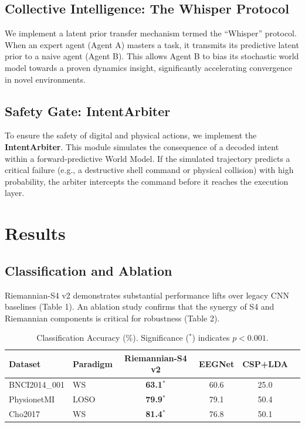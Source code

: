 \documentclass[11pt,a4paper]{article}
\begin{document}
\subsection{Collective Intelligence: The Whisper Protocol}
We implement a latent prior transfer mechanism termed the ``Whisper'' protocol. When an expert agent (Agent A) masters a task, it transmits its predictive latent prior to a naive agent (Agent B). This allows Agent B to bias its stochastic world model towards a proven dynamics insight, significantly accelerating convergence in novel environments.

\subsection{Safety Gate: IntentArbiter}
To ensure the safety of digital and physical actions, we implement the \textbf{IntentArbiter}. This module simulates the consequence of a decoded intent within a forward-predictive World Model. If the simulated trajectory predicts a critical failure (e.g., a destructive shell command or physical collision) with high probability, the arbiter intercepts the command before it reaches the execution layer.

\section{Results}

\subsection{Classification and Ablation}
Riemannian-S4 v2 demonstrates substantial performance lifts over legacy CNN baselines (Table 1). An ablation study confirms that the synergy of S4 and Riemannian components is critical for robustness (Table 2).

\begin{table}[ht]
\centering
\caption{Classification Accuracy (\%). Significance ($^*$) indicates $p < 0.001$.}
\label{tab:results}
\begin{tabular}{@{}llcccc@{}}
\toprule
\textbf{Dataset} & \textbf{Paradigm} & \textbf{Riemannian-S4 v2} & \textbf{EEGNet} & \textbf{CSP+LDA} \\ \midrule
BNCI2014\_001 & WS & \textbf{63.1}$^*$ & 60.6 & 25.0 \\
PhysionetMI & LOSO & \textbf{79.9}$^*$ & 79.1 & 50.4 \\
Cho2017 & WS & \textbf{81.4}$^*$ & 76.8 & 50.1 \\ \bottomrule
\end{tabular}
\end{table}
\end{document}

